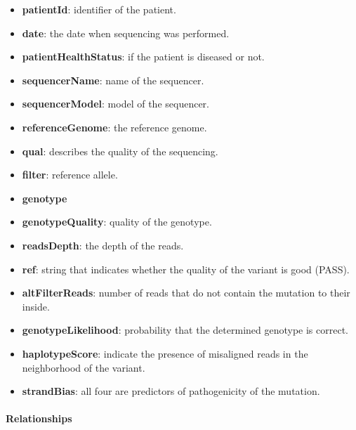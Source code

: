 \begin{itemize}
 	\item \textbf{patientId}: identifier of the patient.
 	\item \textbf{date}: the date when sequencing was performed.
 	\item \textbf{patientHealthStatus}: if the patient is diseased or not.
 	\item \textbf{sequencerName}: name of the sequencer.
 	\item \textbf{sequencerModel}: model of the sequencer.
 	\item \textbf{referenceGenome}: the reference genome.
 	\item \textbf{qual}: describes the quality of the sequencing.
 	\item \textbf{filter}: reference allele.
 	\item \textbf{genotype}
 	\item \textbf{genotypeQuality}: quality of the genotype.
 	\item \textbf{readsDepth}: the depth of the reads.
 	\item \textbf{ref}: string that indicates whether the quality of the variant is good (PASS).
 	\item \textbf{altFilterReads}: number of reads that do not contain the mutation to their inside.
 	\item \textbf{genotypeLikelihood}: probability that the determined genotype is correct.
 	\item \textbf{haplotypeScore}: indicate the presence of misaligned reads in the neighborhood of the variant.
 	\item \textbf{strandBias}: all four are predictors of pathogenicity of the mutation.
\end{itemize}

\paragraph{Relationships} 

